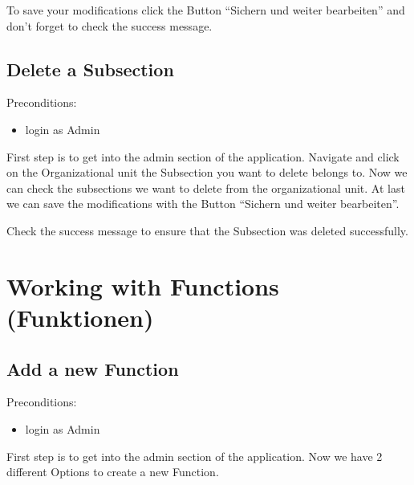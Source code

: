 \documentclass[letterpaper,10pt,english]{sphinxmanual}
\begin{document}
\noindent{}

To save your modifications click the Button “Sichern und weiter bearbeiten”
and don’t forget to check the success message.


\subsection{Delete a Subsection}
\label{\detokenize{masterUserDoc:delete-a-subsection}}
Pre\sphinxhyphen{}conditions:
\begin{itemize}
\item {} 
login as Admin

\end{itemize}

First step is to get into the admin section of the application.
Navigate and click on the Organizational unit the Subsection you want to delete
belongs to. Now we can check the subsections we want to delete from the
organizational unit. At last we can save the modifications with the Button
“Sichern und weiter bearbeiten”.

\noindent{}

Check the success message to ensure that the Subsection was deleted successfully.

\noindent{}


\section{Working with Functions (Funktionen)}
\label{\detokenize{masterUserDoc:working-with-functions-funktionen}}

\subsection{Add a new Function}
\label{\detokenize{masterUserDoc:add-a-new-function}}
Pre\sphinxhyphen{}conditions:
\begin{itemize}
\item {} 
login as Admin

\end{itemize}

First step is to get into the admin section of the application.
Now we have 2 different Options to create a new Function.
\end{document}
